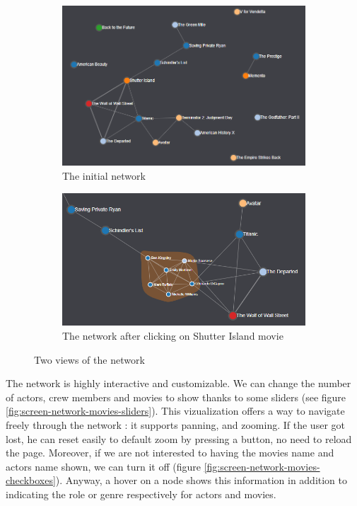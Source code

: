 \documentclass[a4paper,10pt]{article}
\begin{document}
\begin{figure}[ht]
 \begin{subfigure}{.5\textwidth}
  \centering
  \includegraphics[height=0.55\linewidth]{images/screens/network-movies.png}
  \caption{The initial network} \label{fig:screen-network-movies}
 \end{subfigure}\hfill
 \begin{subfigure}{.5\textwidth}
  \centering
  \includegraphics[height=0.55\linewidth]{images/screens/network-movies-shutter-island.png}
  \caption{The network after clicking on Shutter Island movie} \label{fig:screen-network-movies-shutter-island}
 \end{subfigure}
 \caption{Two views of the network}
\end{figure}

The network is highly interactive and customizable. We can change the number of actors,
crew members and movies to show thanks to some sliders (see figure \ref{fig:screen-network-movies-sliders}).
This vizualization offers a way to navigate freely through the network : it supports panning,
and zooming. If the user got lost, he can reset easily to default zoom by pressing a button, no
need to reload the page. Moreover, if we are not interested to having the movies name and actors name shown,
we can turn it off (figure \ref{fig:screen-network-movies-checkboxes}). Anyway, a hover on a node shows this information in addition to
indicating the role or genre respectively for actors and movies.
\end{document}
